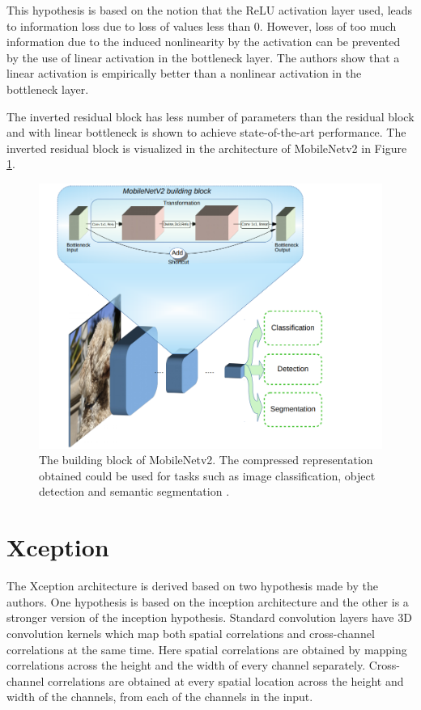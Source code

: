 This hypothesis is based on the notion that the ReLU activation layer used, leads to information loss due to loss of values less than 0. However, loss of too much information due to the induced nonlinearity by the activation can be prevented by the use of linear activation in the bottleneck layer. The authors show that a linear activation is empirically better than a nonlinear activation in the bottleneck layer.

The inverted residual block has less number of parameters than the residual block and with linear bottleneck is shown to achieve state-of-the-art performance. The inverted residual block is visualized in the architecture of MobileNetv2 in Figure \ref{Fig:mobileNetv2bb}.

	\begin{figure}
		\centering
		\includegraphics[width=.7\linewidth]{images/mobileNetv2_bb}
		\caption{The building block of MobileNetv2. The compressed representation obtained could be used for tasks such as image classification, object detection and semantic segmentation \cite{mnbb}.}
		\label{Fig:mobileNetv2bb}
	\end{figure}

\section{Xception}
\label{section:xcep}

The Xception architecture is derived based on two hypothesis made by the authors. One hypothesis is based on the inception architecture and the other is a stronger version of the inception hypothesis. Standard convolution layers have 3D convolution kernels which map both spatial correlations and cross-channel correlations at the same time. Here spatial correlations are obtained by mapping correlations across the height and the width of every channel separately. Cross-channel correlations are obtained at every spatial location across the height and width of the channels, from each of the channels in the input. 

